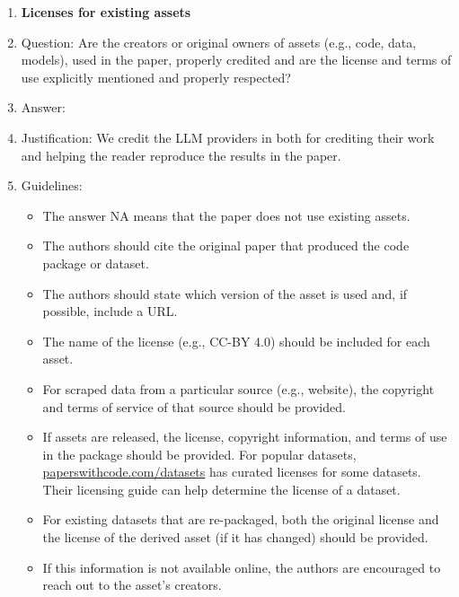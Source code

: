 \documentclass{article}
\begin{document}
\begin{enumerate}
\item {\bf Licenses for existing assets}
    \item[] Question: Are the creators or original owners of assets (e.g., code, data, models), used in the paper, properly credited and are the license and terms of use explicitly mentioned and properly respected?
    \item[] Answer: \answerYes{} %
    \item[] Justification: We credit the LLM providers in  both for crediting their work and helping the reader reproduce the results in the paper.
    \item[] Guidelines:
    \begin{itemize}
        \item The answer NA means that the paper does not use existing assets.
        \item The authors should cite the original paper that produced the code package or dataset.
        \item The authors should state which version of the asset is used and, if possible, include a URL.
        \item The name of the license (e.g., CC-BY 4.0) should be included for each asset.
        \item For scraped data from a particular source (e.g., website), the copyright and terms of service of that source should be provided.
        \item If assets are released, the license, copyright information, and terms of use in the package should be provided. For popular datasets, \url{paperswithcode.com/datasets} has curated licenses for some datasets. Their licensing guide can help determine the license of a dataset.
        \item For existing datasets that are re-packaged, both the original license and the license of the derived asset (if it has changed) should be provided.
        \item If this information is not available online, the authors are encouraged to reach out to the asset's creators.
    \end{itemize}


\end{enumerate}
\end{document}
